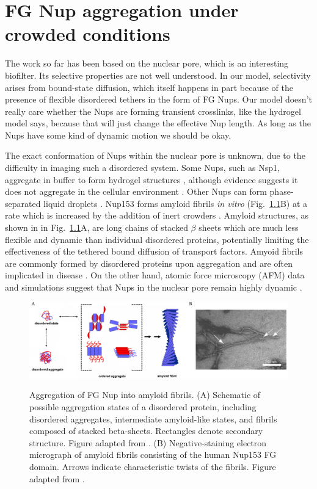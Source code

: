 \chapter{FG Nup aggregation under crowded conditions}\label{ch05}

The work so far has been based on the nuclear pore, which is an interesting biofilter.  Its selective properties are not well understood.  In our model, selectivity arises from bound-state diffusion, which itself happens in part because of the presence of flexible disordered tethers in the form of FG Nups.  Our model doesn't really care whether the Nups are forming transient crosslinks, like the hydrogel model says, because that will just change the effective Nup length.  As long as the Nups have some kind of dynamic motion we should be okay.

The exact conformation of Nups within the nuclear pore is unknown, due to the difficulty in imaging such a disordered system.  Some Nups, such as Nsp1, aggregate in buffer to form hydrogel structures \cite{frey06, frey07, ader10}, although evidence suggests it does not aggregate in the cellular environment \cite{hough15}.  Other Nups can form phase-separated liquid droplets \cite{schmidt15}.  Nup153 forms amyloid fibrils \textit{in vitro} (Fig.~\ref{fig:amyloid}B) at a rate which is increased by the addition of inert crowders \cite{milles13}.  Amyloid structures, as shown in in Fig.~\ref{fig:amyloid}A, are long chains of stacked $\beta$ sheets which are much less flexible and dynamic than individual disordered proteins, potentially limiting the effectiveness of the tethered bound diffusion of transport factors.  Amyoid fibrils are commonly formed by disordered proteins upon aggregation and are often implicated in disease \cite{jahn08}.    On the other hand, atomic force microscopy (AFM) data and simulations suggest that Nups in the nuclear pore remain highly dynamic \cite{sakiyama16,moussavi-baygi16}.

\begin{figure}
\caption[Aggregation of FG Nup into amyloid fibrils.]{Aggregation of FG Nup into amyloid fibrils. (A) Schematic of possible aggregation states of a disordered protein, including disordered aggregates, intermediate amyloid-like states, and fibrils composed of stacked beta-sheets. Rectangles denote secondary structure.  Figure adapted from \cite{jahn08}. (B) Negative-staining electron micrograph of amyloid fibrils consisting of the human Nup153 FG domain.  Arrows indicate characteristic twists of the fibrils.  Figure adapted from \cite{milles13}.}
\centering
\includegraphics[width=\textwidth]{figs/ch05/amyloid-intro}
\label{fig:amyloid}
\end{figure}

